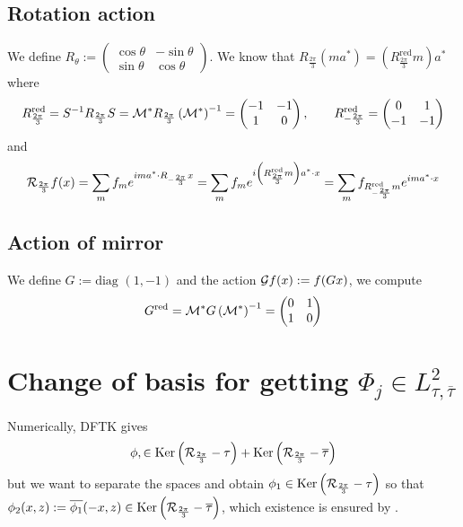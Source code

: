 \documentclass[11pt,a4paper,reqno,french,tikz]{amsart}
\newcommand{\pa}[1]{\left( #1 \right)} %
\let\p\relax\newcommand{\p}{\psi} %
\newcommand{\f}[2]{\frac{#1}{#2}} %
\newcommand{\mat}[1]{\begin{pmatrix} #1 \end{pmatrix}} %
\begin{document}
\subsection{Rotation action}%
\label{sub:rotation_action}

We define $R_\theta := \mat{\cos \theta & -\sin \theta \\ \sin \theta & \cos \theta}$. We know that $R_{\f{2\pi}3} \pa{ma^* } = \pa{R_{\f{2\pi}3}^{\text{red}} m} a^*$ where
\begin{align*}
	R_{\f{2\pi}3}^{\text{red}} = S^{-1} R_{\f{2\pi}3} S =  \cM^* R_{\f{2\pi}3} \pa{\cM^*}^{-1} = \mat{-1 & -1 \\ 1 & 0}, \qquad R_{-\f{2\pi}3}^{\text{red}} = \mat{0 & 1 \\ -1 & -1}
\end{align*}
and
\begin{align*}
\cR_{\f{2\pi}3} f(x) =  \sum_m f_m e^{i m a^* \cdot R_{-\f{2\pi}3} x}= \sum_m f_m e^{i \pa{R_{\f{2\pi}3}^{\text{red}} m} a^* \cdot x} = \sum_m f_{R_{-\f{2\pi}3}^{\text{red}} m} e^{im a^* \cdot x}
\end{align*}



\subsection{Action of mirror}%
\label{sub:action_of_mirror}

We define $G := \text{diag } \pa{1,-1}$ and the action $\mathcal{G} f(x) := f(Gx)$, we compute
\begin{align*}
	G^{\text{red}} = \cM^* G \pa{\cM^*}^{-1} = \mat{0 & 1 \\ 1 & 0}
\end{align*}




\section{Change of basis for getting $\Phi_j \in L^2_{\tau,\overline{\tau}}$}%
\label{sub:change_of_basis_for_getting_l_2__tau_tau}
Numerically, DFTK gives 
\begin{align*}
\phi, \p \in \Ker \pa{\cR_{\f{2\pi}{3}}-\tau} + \Ker\pa{\cR_{\f{2\pi}{3}}-\overline{\tau}}
\end{align*}
but we want to separate the spaces and obtain $\phi_1 \in \Ker \pa{\cR_{\f{2\pi}{3}}-\tau}$ so that $\phi_2(x,z) := \overline{\phi_1}(-x,z) \in \Ker\pa{\cR_{\f{2\pi}{3}}-\overline{\tau}}$, which existence is ensured by \cite{FefWei12}.
\end{document}
